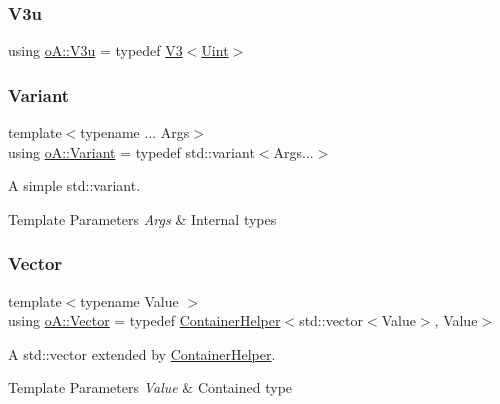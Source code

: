 \subsubsection{\texorpdfstring{V3u}{V3u}}
{\footnotesize\ttfamily using \mbox{\hyperlink{namespaceo_a_ae91b6ba950b8f72e43ee17b69dbfeaad}{o\+A\+::\+V3u}} = typedef \mbox{\hyperlink{structo_a_1_1_v3}{V3}}$<$\mbox{\hyperlink{namespaceo_a_abe1d8250226c5cf34f84d7b75fc7922e}{Uint}}$>$}

\mbox{\label{namespaceo_a_a46a1498e4e673b19327a24fac0018867}} 
\subsubsection{\texorpdfstring{Variant}{Variant}}
{\footnotesize\ttfamily template$<$typename ... Args$>$ \\
using \mbox{\hyperlink{namespaceo_a_a46a1498e4e673b19327a24fac0018867}{o\+A\+::\+Variant}} = typedef std\+::variant$<$Args...$>$}



A simple std\+::variant. 


\begin{DoxyTemplParams}{Template Parameters}
{\em Args} & Internal types \\
\hline
\end{DoxyTemplParams}
\mbox{\label{namespaceo_a_a10997b8f468dc32c0a3e5e2ff56c57c1}} 
\subsubsection{\texorpdfstring{Vector}{Vector}}
{\footnotesize\ttfamily template$<$typename Value $>$ \\
using \mbox{\hyperlink{namespaceo_a_a10997b8f468dc32c0a3e5e2ff56c57c1}{o\+A\+::\+Vector}} = typedef \mbox{\hyperlink{classo_a_1_1_container_helper}{Container\+Helper}}$<$std\+::vector$<$Value$>$, Value$>$}



A std\+::vector extended by \mbox{\hyperlink{classo_a_1_1_container_helper}{Container\+Helper}}. 


\begin{DoxyTemplParams}{Template Parameters}
{\em Value} & Contained type \\
\hline
\end{DoxyTemplParams}


